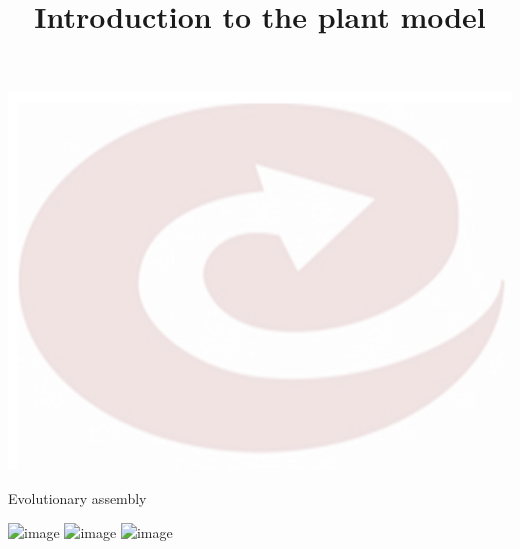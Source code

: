 \documentclass[mathserif,11pt]{beamer}
\title{Introduction to the plant model}
\date{}
\author{}
\begin{document}

{\includegraphics[width=\paperwidth,height=\paperheight,keepaspectratio]{pics/background.png}}

 \begin{frame}[plain]
 \vspace{10em}
 \begin{TitleBox}
  {\LARGE \inserttitle} \vskip3pt
  {\footnotesize \insertdate\vskip6pt
  \insertauthor }
 \end{TitleBox}
 \end{frame}


\begin{frame}{Evolutionary assembly}
  \begin{center}
    \includegraphics<1>[height=.8\textheight]{figures/fitness-1}
    \includegraphics<2>[height=.8\textheight]{figures/fitness-2}
    \includegraphics<3>[height=.8\textheight]{figures/fitness-3}
  \end{center}
\end{frame}

\end{document}
